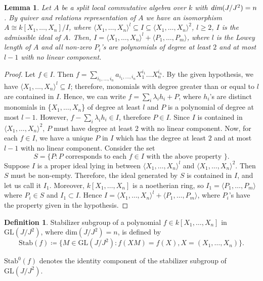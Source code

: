 \documentclass[12pt]{amsart}
\newtheorem{lemma}[theorem]{Lemma}
\theoremstyle{definition}
\newtheorem{definition}[theorem]{Definition}
\numberwithin{equation}{section}
\begin{document}
\begin{lemma}\label{Lemma 5.9}
Let $A$ be a split local commutative algebra over $k$ with $\emph{dim}(J/J^2)=n$. By quiver and relations representation of $A$ we have an isomorphism $A\cong k[X_1,\dots,X_n]/I$, where $\langle X_1,\dots,X_n \rangle^l \subseteq I\subseteq \langle X_1,\dots,X_n \rangle^2$, $l\geq 2$, $I$ is the admissible ideal of $A$. Then, $I=\langle X_1,\dots,X_n \rangle^l+\langle P_1,\dots,P_m \rangle$, where $l$ is the Lowey length of $A$ and all non-zero $P_i$'s are polynomials of degree at least $2$ and at most $l-1$ with no linear component.
\end{lemma}
\vskip1mm
\begin{proof}
Let $f\in I$. Then $f=\sum_{i_1,\dots,i_n}a_{i_{1},\dots,i_{n}}X_{1}^{i_{1}}\dots X_{n}^{i_{n}}$. By the given hypothesis, we have $\langle X_1,\dots, X_n \rangle^l\subseteq I$; therefore, monomials with degree greater than or equal to $l$ are contained in $I$. Hence, we can write $f=\sum_{i}\lambda_{i}h_i+P$, where $h_i$'s are distinct monomials in \{$X_1,\dots,X_n$\} of degree at least $l$ and $P$ is a polynomial of degree at most $l-1$. However, $f-\sum_{i}\lambda_{i}h_{i}\in I$, therefore $P\in I$. Since $I$ is contained in $\langle X_1,\dots,X_n\rangle ^2$, $P$ must have degree at least $2$ with no linear component. Now, for each $f\in I$, we have a unique $P$ in $I$ which has the degree at least $2$ and at most $l-1$ with no linear component. Consider the set
\[S=\{P: P \text{ corresponds to each } f\in I \text{ with the above property }\}.\] Suppose $I$ is a proper ideal lying in between $\langle X_1,\dots,X_n\rangle^l$ and $\langle X_1,\dots,X_n\rangle ^2$. Then $S$ must be non-empty. Therefore, the ideal generated by $S$ is contained in $I$, and let us call it $I_1$. Moreover, $k[X_1,\dots,X_n]$ is a noetherian ring, so $I_1= \langle P_1,\dots,P_m \rangle$ where $P_i\in S$ and $I_1\subset I$. Hence $I=\langle X_1,\dots,X_n\rangle^l+\langle P_1,\dots,P_m\rangle$, where ${P_i}$'s have the property given in the hypothesis.
\end{proof}
\vskip2mm
\begin{definition}\label{Definition 5.10} 
Stabilizer subgroup of a polynomial $f\in k[X_1,\dots,X_n]$ in $\text{GL}(J/J^2)$, where $\text{dim}(J/J^2)=n$, is defined by 
\begin{equation*}\label{eq28}
\text{Stab}(f)\coloneq\{M\in \text{GL}(J/J^2): f(XM)=f(X), X=(X_1,\dots,X_n)\}.
\end{equation*}
\end{definition}
\noindent
$\text{Stab}^{0}(f)$ denotes the identity component of the stabilizer subgroup of $\text{GL}(J/J^2)$.
\end{document}
